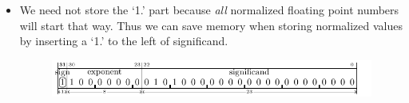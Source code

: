 \begin{itemize}
\item We need not store the `1.' part because {\em all} normalized floating
point numbers will start that way.  Thus we can save memory when storing
normalized values by inserting a `1.' to the left of significand.

\begin{figure}[H]
   \includegraphics{figures/appendix02/floatNumber.pdf}
\end{figure}

%
%
%
%
%
%
%
%


\end{itemize}
